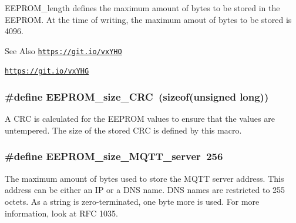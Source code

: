 E\-E\-P\-R\-O\-M\-\_\-length defines the maximum amount of bytes to be stored in the E\-E\-P\-R\-O\-M. At the time of writing, the maximum amout of bytes to be stored is 4096. 

\begin{DoxySeeAlso}{See Also}
\href{https://git.io/vxYHO}{\tt https\-://git.\-io/vx\-Y\-H\-O} 

\href{https://git.io/vxYHG}{\tt https\-://git.\-io/vx\-Y\-H\-G} 
\end{DoxySeeAlso}
\hypertarget{WIFIOnOff_8ino_af12bb22226c8f91f856f93ef2ddad3ec}{
\subsubsection[{E\-E\-P\-R\-O\-M\-\_\-size\-\_\-\-C\-R\-C}]{\setlength{\rightskip}{0pt plus 5cm}\#define E\-E\-P\-R\-O\-M\-\_\-size\-\_\-\-C\-R\-C~(sizeof(unsigned long))}}\label{WIFIOnOff_8ino_af12bb22226c8f91f856f93ef2ddad3ec}


A C\-R\-C is calculated for the E\-E\-P\-R\-O\-M values to ensure that the values are untempered. The size of the stored C\-R\-C is defined by this macro. 

\hypertarget{WIFIOnOff_8ino_ac060eafb02eba00d33cad29f38819d4a}{
\subsubsection[{E\-E\-P\-R\-O\-M\-\_\-size\-\_\-\-M\-Q\-T\-T\-\_\-server}]{\setlength{\rightskip}{0pt plus 5cm}\#define E\-E\-P\-R\-O\-M\-\_\-size\-\_\-\-M\-Q\-T\-T\-\_\-server~256}}\label{WIFIOnOff_8ino_ac060eafb02eba00d33cad29f38819d4a}


The maximum amount of bytes used to store the M\-Q\-T\-T server address. This address can be either an I\-P or a D\-N\-S name. D\-N\-S names are restricted to 255 octets. As a string is zero-\/terminated, one byte more is used. For more information, look at R\-F\-C 1035. 


